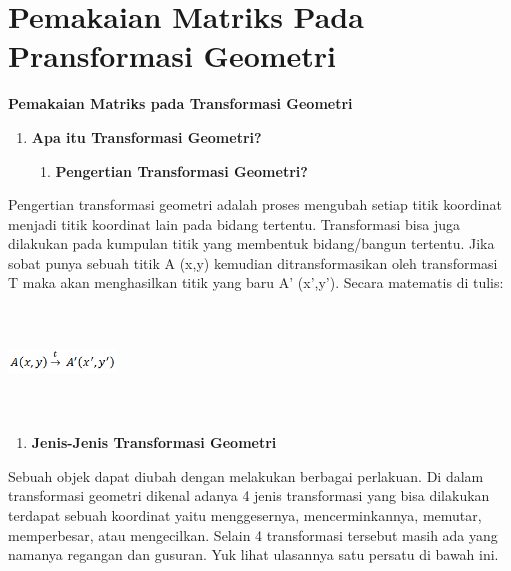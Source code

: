 \documentclass[11pt,fleqn]{book} %
\begin{document}
\section{Pemakaian Matriks Pada Pransformasi Geometri}

\begin{center}
\LARGE \textbf{Pemakaian Matriks pada Transformasi Geometri}
\end{center}

\begin{enumerate}
\item \textbf{Apa itu Transformasi Geometri?}

\begin{enumerate}
\item \textbf{ Pengertian Transformasi Geometri?}
\end{enumerate}
\end{enumerate}

\noindent 
 Pengertian transformasi geometri adalah proses mengubah setiap titik koordinat menjadi titik koordinat lain pada bidang tertentu. Transformasi bisa juga dilakukan pada kumpulan titik yang membentuk bidang/bangun tertentu. Jika sobat punya sebuah titik A (x,y) kemudian ditransformasikan oleh transformasi T maka akan menghasilkan titik yang baru A’ (x’,y’). Secara matematis di tulis:

\noindent 
\noindent 
\noindent 
\begin{center}
	\noindent \includegraphics*[width=1.12in, height=1.12in, keepaspectratio=false, trim=0.00in 0.11in 0.00in 0.00in]{Pictures/1.PNG}
\end{center}

\begin{enumerate}
	\item \textbf{Jenis-Jenis Transformasi Geometri}
\end{enumerate}

\noindent 
Sebuah objek dapat diubah dengan melakukan berbagai perlakuan. Di dalam transformasi geometri dikenal adanya 4 jenis transformasi yang bisa dilakukan terdapat sebuah koordinat yaitu menggesernya, mencerminkannya, memutar, memperbesar, atau mengecilkan. Selain 4 transformasi tersebut masih ada yang namanya regangan dan gusuran. Yuk lihat ulasannya satu persatu di bawah ini.
\end{document}
